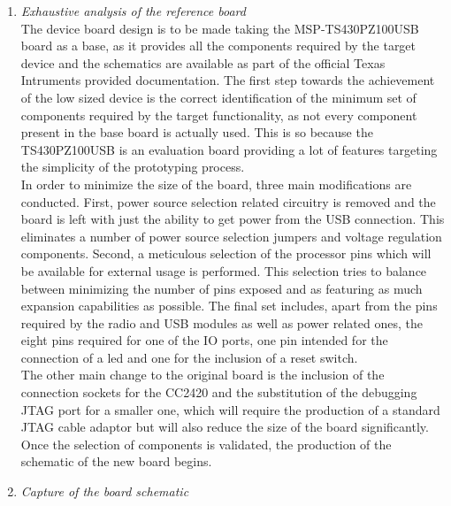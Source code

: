 		\begin{enumerate}
		\item \emph{Exhaustive analysis of the reference board}\\

			The device board design is to be made taking the MSP-TS430PZ100USB board as a base, as it provides all the components required by the target device and the schematics are available as part of the official Texas Intruments provided documentation. The first step towards the achievement of the low sized device is the correct identification of the minimum set of components required by the target functionality, as not every component present in the base board is actually used. This is so because the TS430PZ100USB is an evaluation board providing a lot of features targeting the simplicity of the prototyping process.\\

			 In order to minimize the size of the board, three main modifications are conducted. First, power source selection related circuitry is removed and the board is left with just the ability to get power from the USB connection. This eliminates a number of power source selection jumpers and voltage regulation components. Second, a meticulous selection of the processor pins which will be available for external usage is performed. This selection tries to balance between minimizing the number of pins exposed and as featuring as much expansion capabilities as possible. The final set includes, apart from the pins required by the radio and USB modules as well as power related ones, the eight pins required for one of the IO ports, one pin intended for the connection of a led and one for the inclusion of a reset switch.\\

			The other main change to the original board is the inclusion of the connection sockets for the CC2420 and the substitution of the debugging JTAG port for a smaller one, which will require the production of a standard JTAG cable adaptor but will also reduce the size of the board significantly.\\

			Once the selection of components is validated, the production of the schematic of the new board begins.\\

		\item \emph{Capture of the board schematic}\\
	

\end{enumerate}

